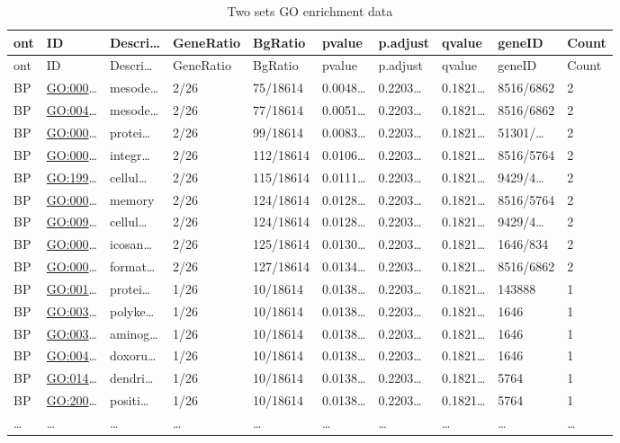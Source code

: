 \documentclass[
]{article}
\begin{document}
\begin{longtable}[]{@{}llllllllll@{}}
\caption{\label{tab:Two-sets-GO-enrichment-data}Two sets GO enrichment data}\tabularnewline
\toprule
ont & ID & Descri\ldots{} & GeneRatio & BgRatio & pvalue & p.adjust & qvalue & geneID & Count\tabularnewline
\midrule
\endfirsthead
\toprule
ont & ID & Descri\ldots{} & GeneRatio & BgRatio & pvalue & p.adjust & qvalue & geneID & Count\tabularnewline
\midrule
\endhead
BP & \url{GO:000}\ldots{} & mesode\ldots{} & 2/26 & 75/18614 & 0.0048\ldots{} & 0.2203\ldots{} & 0.1821\ldots{} & 8516/6862 & 2\tabularnewline
BP & \url{GO:004}\ldots{} & mesode\ldots{} & 2/26 & 77/18614 & 0.0051\ldots{} & 0.2203\ldots{} & 0.1821\ldots{} & 8516/6862 & 2\tabularnewline
BP & \url{GO:000}\ldots{} & protei\ldots{} & 2/26 & 99/18614 & 0.0083\ldots{} & 0.2203\ldots{} & 0.1821\ldots{} & 51301/\ldots{} & 2\tabularnewline
BP & \url{GO:000}\ldots{} & integr\ldots{} & 2/26 & 112/18614 & 0.0106\ldots{} & 0.2203\ldots{} & 0.1821\ldots{} & 8516/5764 & 2\tabularnewline
BP & \url{GO:199}\ldots{} & cellul\ldots{} & 2/26 & 115/18614 & 0.0111\ldots{} & 0.2203\ldots{} & 0.1821\ldots{} & 9429/4\ldots{} & 2\tabularnewline
BP & \url{GO:000}\ldots{} & memory & 2/26 & 124/18614 & 0.0128\ldots{} & 0.2203\ldots{} & 0.1821\ldots{} & 8516/5764 & 2\tabularnewline
BP & \url{GO:009}\ldots{} & cellul\ldots{} & 2/26 & 124/18614 & 0.0128\ldots{} & 0.2203\ldots{} & 0.1821\ldots{} & 9429/4\ldots{} & 2\tabularnewline
BP & \url{GO:000}\ldots{} & icosan\ldots{} & 2/26 & 125/18614 & 0.0130\ldots{} & 0.2203\ldots{} & 0.1821\ldots{} & 1646/834 & 2\tabularnewline
BP & \url{GO:000}\ldots{} & format\ldots{} & 2/26 & 127/18614 & 0.0134\ldots{} & 0.2203\ldots{} & 0.1821\ldots{} & 8516/6862 & 2\tabularnewline
BP & \url{GO:001}\ldots{} & protei\ldots{} & 1/26 & 10/18614 & 0.0138\ldots{} & 0.2203\ldots{} & 0.1821\ldots{} & 143888 & 1\tabularnewline
BP & \url{GO:003}\ldots{} & polyke\ldots{} & 1/26 & 10/18614 & 0.0138\ldots{} & 0.2203\ldots{} & 0.1821\ldots{} & 1646 & 1\tabularnewline
BP & \url{GO:003}\ldots{} & aminog\ldots{} & 1/26 & 10/18614 & 0.0138\ldots{} & 0.2203\ldots{} & 0.1821\ldots{} & 1646 & 1\tabularnewline
BP & \url{GO:004}\ldots{} & doxoru\ldots{} & 1/26 & 10/18614 & 0.0138\ldots{} & 0.2203\ldots{} & 0.1821\ldots{} & 1646 & 1\tabularnewline
BP & \url{GO:014}\ldots{} & dendri\ldots{} & 1/26 & 10/18614 & 0.0138\ldots{} & 0.2203\ldots{} & 0.1821\ldots{} & 5764 & 1\tabularnewline
BP & \url{GO:200}\ldots{} & positi\ldots{} & 1/26 & 10/18614 & 0.0138\ldots{} & 0.2203\ldots{} & 0.1821\ldots{} & 5764 & 1\tabularnewline
\ldots{} & \ldots{} & \ldots{} & \ldots{} & \ldots{} & \ldots{} & \ldots{} & \ldots{} & \ldots{} & \ldots{}\tabularnewline
\bottomrule
\end{longtable}
\end{document}
